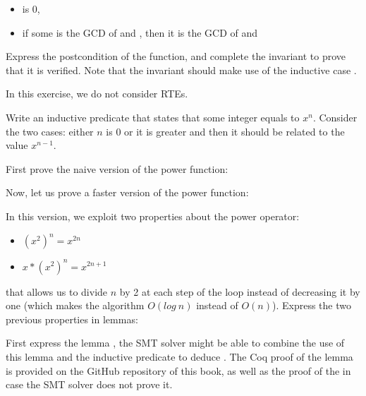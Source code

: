 \begin{itemize}
\item {} is 0,
\item if some  is the GCD of  and ,
  then it is the GCD of  and 
\end{itemize}




Express the postcondition of the function, and complete the invariant to prove
that it is verified. Note that the invariant should make use of the inductive
case .





In this exercise, we do not consider RTEs.


Write an inductive predicate that states that some integer  equals
to $x^n$. Consider the two cases: either $n$ is 0 or it is greater and then it
should be related to the value $x^{n-1}$.




First prove the naive version of the power function:




Now, let us prove a faster version of the power function:




In this version, we exploit two properties about the power operator:


\begin{itemize}
\item $(x^2)^n = x^{2n}$
\item $x * (x^2)^n = x^{2n+1}$
\end{itemize}


that allows us to divide $n$ by 2 at each step of the loop instead of decreasing
it by one (which makes the algorithm $O(log\ n)$ instead of $O(n)$). Express the
two previous properties in lemmas:




First express the lemma , the SMT solver might be able
to combine the use of this lemma and the inductive predicate to deduce
. The Coq proof of the  lemma is
provided on the GitHub repository of this book, as well as the proof of the
 in case the SMT solver does not prove it.


